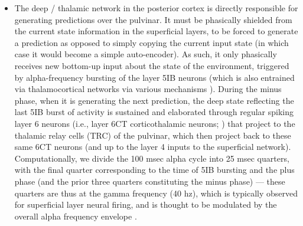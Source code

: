 \documentclass[11pt,twoside]{article}
\newif\myifpdf
\begin{document}
\begin{itemize}

\item The deep / thalamic network in the posterior cortex is directly responsible for generating predictions over the pulvinar.  It must be phasically shielded from the current state information in the superficial layers, to be forced to generate a prediction as opposed to simply copying the current input state (in which case it would become a simple auto-encoder).  As such, it only phasically receives new bottom-up input about the state of the environment, triggered by alpha-frequency bursting of the layer 5IB neurons (which is also entrained via thalamocortical networks via various mechanisms ).  During the minus phase, when it is generating the next prediction, the deep state reflecting the last 5IB burst of activity is sustained and elaborated through regular spiking layer 6 neurons (i.e., layer 6CT corticothalamic neurons; ) that project to the thalamic relay cells (TRC) of the pulvinar, which then project back to these same 6CT neurons (and up to the layer 4 inputs to the superficial network).  Computationally, we divide the 100 msec alpha cycle into 25 msec quarters, with the final quarter corresponding to the time of 5IB bursting and the plus phase (and the prior three quarters constituting the minus phase) --- these quarters are thus at the gamma frequency (40 hz), which is typically observed for superficial layer neural firing, and is thought to be modulated by the overall alpha frequency envelope \cite{DoughertyCoxNinomiyaEtAl17,vanKerkoerleSelfDagninoEtAl14,HaegensNacherLunaEtAl11,LakatosKarmosMehtaEtAl08,SpaakBonnefondMaierEtAl12,BollimuntaMoSchroederEtAl11,BollimuntaChenSchroederEtAl08}.


\end{itemize}
\end{document}
